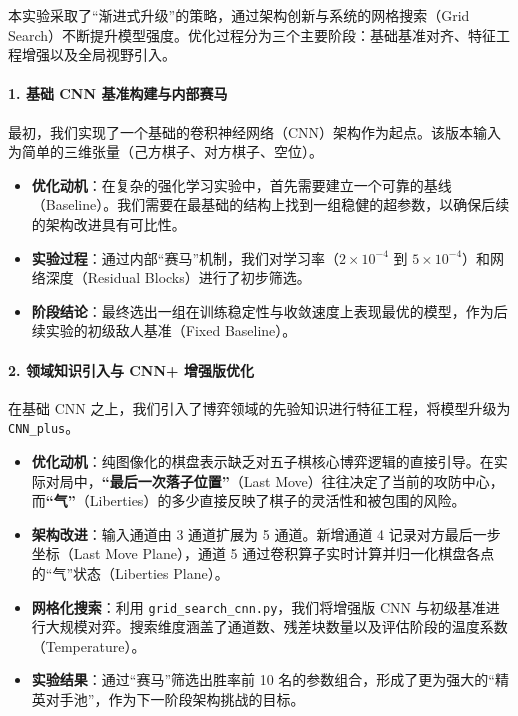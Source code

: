 \documentclass{article}
\begin{document}
本实验采取了“渐进式升级”的策略，通过架构创新与系统的网格搜索（Grid Search）不断提升模型强度。优化过程分为三个主要阶段：基础基准对齐、特征工程增强以及全局视野引入。

\paragraph{1. 基础 CNN 基准构建与内部赛马}
最初，我们实现了一个基础的卷积神经网络（CNN）架构作为起点。该版本输入为简单的三维张量（己方棋子、对方棋子、空位）。
\begin{itemize}
    \item \textbf{优化动机}：在复杂的强化学习实验中，首先需要建立一个可靠的基线（Baseline）。我们需要在最基础的结构上找到一组稳健的超参数，以确保后续的架构改进具有可比性。
    \item \textbf{实验过程}：通过内部“赛马”机制，我们对学习率（$2\times10^{-4}$ 到 $5\times10^{-4}$）和网络深度（Residual Blocks）进行了初步筛选。
    \item \textbf{阶段结论}：最终选出一组在训练稳定性与收敛速度上表现最优的模型，作为后续实验的初级敌人基准（Fixed Baseline）。
\end{itemize}

\paragraph{2. 领域知识引入与 CNN+ 增强版优化}
在基础 CNN 之上，我们引入了博弈领域的先验知识进行特征工程，将模型升级为 \texttt{CNN\_plus}。
\begin{itemize}
    \item \textbf{优化动机}：纯图像化的棋盘表示缺乏对五子棋核心博弈逻辑的直接引导。在实际对局中，\textbf{“最后一次落子位置”}（Last Move）往往决定了当前的攻防中心，而\textbf{“气”}（Liberties）的多少直接反映了棋子的灵活性和被包围的风险。
    \item \textbf{架构改进}：输入通道由 3 通道扩展为 5 通道。新增通道 4 记录对方最后一步坐标（Last Move Plane），通道 5 通过卷积算子实时计算并归一化棋盘各点的“气”状态（Liberties Plane）。
    \item \textbf{网格化搜索}：利用 \texttt{grid\_search\_cnn.py}，我们将增强版 CNN 与初级基准进行大规模对弈。搜索维度涵盖了通道数、残差块数量以及评估阶段的温度系数（Temperature）。
    \item \textbf{实验结果}：通过“赛马”筛选出胜率前 10 名的参数组合，形成了更为强大的“精英对手池”，作为下一阶段架构挑战的目标。
\end{itemize}
\end{document}

